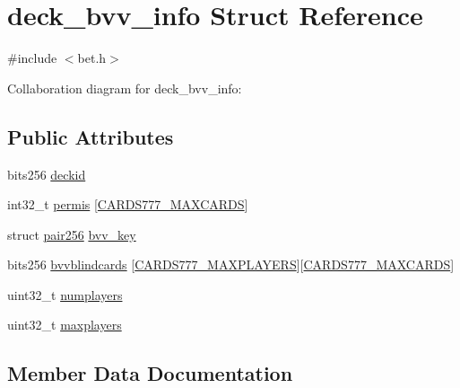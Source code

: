 \hypertarget{structdeck__bvv__info}{}\section{deck\+\_\+bvv\+\_\+info Struct Reference}
\label{structdeck__bvv__info}


{\ttfamily \#include $<$bet.\+h$>$}



Collaboration diagram for deck\+\_\+bvv\+\_\+info\+:
\subsection*{Public Attributes}
\begin{DoxyCompactItemize}
\item 
bits256 \hyperlink{structdeck__bvv__info_a33dcbc6d6f96dd7270ddd0dc2f418b25}{deckid}
\item 
int32\+\_\+t \hyperlink{structdeck__bvv__info_ab8b8de70d12f184c0ac81af66ca5c083}{permis} \mbox{[}\hyperlink{common_8h_a90f0ea2d767ac1915e44acb24a1fe1bd}{C\+A\+R\+D\+S777\+\_\+\+M\+A\+X\+C\+A\+R\+DS}\mbox{]}
\item 
struct \hyperlink{structpair256}{pair256} \hyperlink{structdeck__bvv__info_a7b011d6e18b84f26dd65d24b631d6d24}{bvv\+\_\+key}
\item 
bits256 \hyperlink{structdeck__bvv__info_a1555643bed8aed064081d11c3895807a}{bvvblindcards} \mbox{[}\hyperlink{common_8h_a97d6188fd175f4ea7268e9445107a7c0}{C\+A\+R\+D\+S777\+\_\+\+M\+A\+X\+P\+L\+A\+Y\+E\+RS}\mbox{]}\mbox{[}\hyperlink{common_8h_a90f0ea2d767ac1915e44acb24a1fe1bd}{C\+A\+R\+D\+S777\+\_\+\+M\+A\+X\+C\+A\+R\+DS}\mbox{]}
\item 
uint32\+\_\+t \hyperlink{structdeck__bvv__info_a498eddcaa0edbf7e9993c97e34bfdb81}{numplayers}
\item 
uint32\+\_\+t \hyperlink{structdeck__bvv__info_a6afb9fe25b3093496c0151d564b17175}{maxplayers}
\end{DoxyCompactItemize}


\subsection{Member Data Documentation}
\mbox{\label{structdeck__bvv__info_a7b011d6e18b84f26dd65d24b631d6d24}} 
